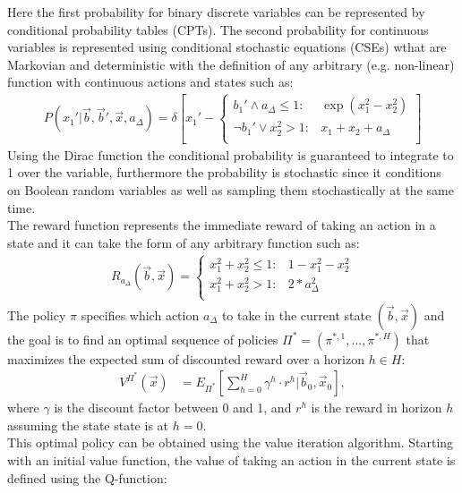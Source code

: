 \documentclass[letterpaper]{article}
\renewcommand{\-}{\text{-}}
\begin{document}
Here the first probability for binary discrete variables can be represented by conditional probability tables (CPTs). The second probability for continuous variables is represented using conditional stochastic equations (CSEs) wthat are Markovian and deterministic with the definition of any arbitrary (e.g. non-linear) function with continuous actions and states such as:
\vspace{-3mm}
{\footnotesize
\begin{align}
P(x_1' | \vec{b},\vec{b}',\vec{x},a_{\Delta}) = \delta\left[ x_1' - 
\begin{cases}
b_1' \land a_{\Delta} \leq 1 : & \exp(x_1^2 - x_2^2) \\
\neg b_1' \lor  x_2^2 > 1 : & x_1 + x_2 +a_{\Delta} \\
\end{cases}
\right] \label{eq:ex_csde}
\end{align}}
Using the Dirac function the conditional probability is guaranteed to integrate to 1 over the variable, furthermore the probability is stochastic since it conditions on Boolean random variables as well as sampling them stochastically at the same time. \\
The reward function represents the immediate reward of taking an action in a state and it can take the form of any arbitrary function such as:
\begin{align}
R_{a_{\Delta}}(\vec{b},\vec{x}) = \begin{cases}
x_1^2 + x_2^2 \leq 1 : & 1 - x_1^2 - x_2^2  \\
x_1^2 + x_2^2 > 1 : & 2 * a_{\Delta}^2 \\
\end{cases} \label{eq:simple_reward}
\end{align}
The policy $\pi$ specifies which action $a_{\Delta}$ to take in the current state  $(\vec{b},\vec{x})$ and the goal is to find an optimal sequence of policies
$\Pi^* = (\pi^{*,1},\ldots,\pi^{*,H})$ that maximizes the expected sum of discounted reward over a horizon $h \in H $: \\
\begin{align}
V^{\Pi^*}(\vec{x}) & = E_{\Pi^*} \left[ \sum_{h=0}^{H} \gamma^h \cdot r^h \Big| \vec{b}_0,\vec{x}_0 \right], \label{eq:vfun_def}
\end{align}
where $\gamma$ is the discount factor between 0 and 1, and  $r^h$ is the reward in horizon $h$ assuming the state state is at $h=0$.\\
This optimal policy can be obtained using the value iteration algorithm. Starting  with an initial value function, the value of taking an action in the current state is defined using the Q-function:  
\end{document}
